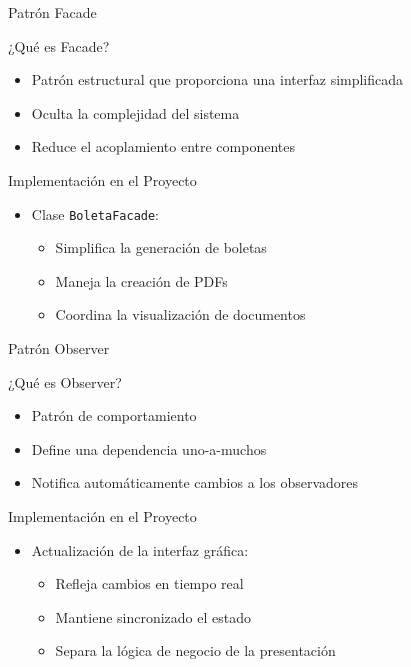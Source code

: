 \documentclass[12pt]{beamer}
\begin{document}
\begin{frame}{Patrón Facade}
    \begin{exampleblock}{¿Qué es Facade?}
        \begin{itemize}
            \item Patrón estructural que proporciona una interfaz simplificada
            \item Oculta la complejidad del sistema
            \item Reduce el acoplamiento entre componentes
        \end{itemize}
    \end{exampleblock}
    \begin{alertblock}{Implementación en el Proyecto}
        \begin{itemize}
            \item Clase \texttt{BoletaFacade}:
            \begin{itemize}
                \item Simplifica la generación de boletas
                \item Maneja la creación de PDFs
                \item Coordina la visualización de documentos
            \end{itemize}
        \end{itemize}
    \end{alertblock}
\end{frame}

\begin{frame}{Patrón Observer}
    \begin{exampleblock}{¿Qué es Observer?}
        \begin{itemize}
            \item Patrón de comportamiento
            \item Define una dependencia uno-a-muchos
            \item Notifica automáticamente cambios a los observadores
        \end{itemize}
    \end{exampleblock}
    \begin{alertblock}{Implementación en el Proyecto}
        \begin{itemize}
            \item Actualización de la interfaz gráfica:
            \begin{itemize}
                \item Refleja cambios en tiempo real
                \item Mantiene sincronizado el estado
                \item Separa la lógica de negocio de la presentación
            \end{itemize}
        \end{itemize}
    \end{alertblock}
\end{frame}
\end{document}
